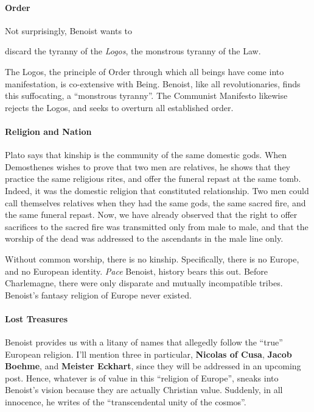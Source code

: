 \paragraph{Order}


Not surprisingly, Benoist wants to

\begin{quotex}
discard the tyranny of the \emph{Logos}, the monstrous tyranny of the Law.
\end{quotex}


The Logos, the principle of Order through which all beings have come into manifestation, is co-extensive with Being. Benoist, like all revolutionaries, finds this suffocating, a ``monstrous tyranny''. The Communist Manifesto likewise rejects the Logos, and seeks to overturn all established order.

\paragraph{Religion and Nation}


\begin{quotex}
Plato says that kinship is the community of the same domestic gods. When Demosthenes wishes to prove that two men are relatives, he shows that they practice the same religious rites, and offer the funeral repast at the same tomb. Indeed, it was the domestic religion that constituted relationship. Two men could call themselves relatives when they had the same gods, the same sacred fire, and the same funeral repast. Now, we have already observed that the right to offer sacrifices to the sacred fire was transmitted only from male to male, and that the worship of the dead was addressed to the ascendants in the male line only.
\end{quotex}


Without common worship, there is no kinship. Specifically, there is no Europe, and no European identity. \emph{Pace} Benoist, history bears this out. Before Charlemagne, there were only disparate and mutually incompatible tribes. Benoist's fantasy religion of Europe never existed.

\paragraph{Lost Treasures}


Benoist provides us with a litany of names that allegedly follow the ``true'' European religion. I'll mention three in particular, \textbf{Nicolas of Cusa}, \textbf{Jacob Boehme}, and \textbf{Meister Eckhart}, since they will be addressed in an upcoming post. Hence, whatever is of value in this ``religion of Europe'', sneaks into Benoist's vision because they are actually Christian value. Suddenly, in all innocence, he writes of the ``transcendental unity of the cosmos''.

